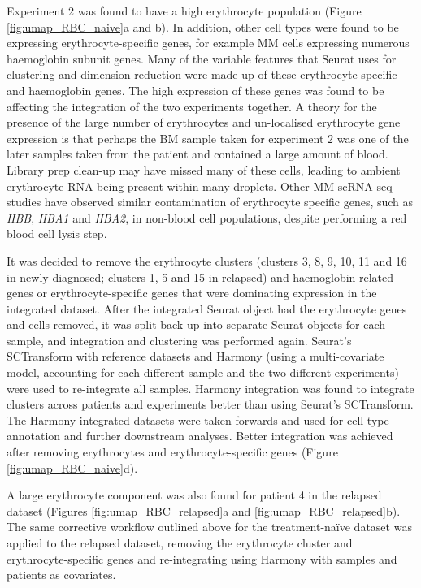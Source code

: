 Experiment 2 was found to have a high erythrocyte population (Figure \ref{fig:umap_RBC_naive}a and b).
In addition, other cell types were found to be expressing erythrocyte-specific genes, for example MM cells expressing numerous haemoglobin subunit genes.
Many of the variable features that Seurat uses for clustering and dimension reduction were made up of these erythrocyte-specific and haemoglobin genes.
The high expression of these genes was found to be affecting the integration of the two experiments together.
A theory for the presence of the large number of erythrocytes and un-localised erythrocyte gene expression is that perhaps the BM sample taken for experiment 2 was one of the later samples taken from the patient and contained a large amount of blood.
Library prep clean-up may have missed many of these cells, leading to ambient erythrocyte RNA being present within many droplets.
Other MM scRNA-seq studies have observed similar contamination of erythrocyte specific genes, such as \textit{HBB}, \textit{HBA1} and \textit{HBA2}, in non-blood cell populations, despite performing a red blood cell lysis step\cite{chen2021cryopreservation}.

It was decided to remove the erythrocyte clusters (clusters 3, 8, 9, 10, 11 and 16 in newly-diagnosed; clusters 1, 5 and 15 in relapsed) and haemoglobin-related genes or erythrocyte-specific genes that were dominating expression in the integrated dataset.
After the integrated Seurat object had the erythrocyte genes and cells removed, it was split back up into separate Seurat objects for each sample, and integration and clustering was performed again.
Seurat's SCTransform with reference datasets and Harmony (using a multi-covariate model, accounting for each different sample and the two different experiments) were used to re-integrate all samples.
Harmony integration was found to integrate clusters across patients and experiments better than using Seurat's SCTransform.
The Harmony-integrated datasets were taken forwards and used for cell type annotation and further downstream analyses.
Better integration was achieved after removing erythrocytes and erythrocyte-specific genes (Figure \ref{fig:umap_RBC_naive}d).

A large erythrocyte component was also found for patient 4 in the relapsed dataset (Figures \ref{fig:umap_RBC_relapsed}a and \ref{fig:umap_RBC_relapsed}b).
The same corrective workflow outlined above for the treatment-na\"ive dataset was applied to the relapsed dataset, removing the erythrocyte cluster and erythrocyte-specific genes and re-integrating using Harmony with samples and patients as covariates.

